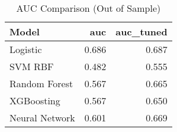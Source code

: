 \begin{table}
\caption{AUC Comparison (Out of Sample)}
\label{tab:auc_oos_compare}
\begin{tabular}{lrr}
\toprule
Model & auc & auc\_tuned \\
\midrule
Logistic & 0.686 & 0.687 \\
SVM RBF & 0.482 & 0.555 \\
Random Forest & 0.567 & 0.665 \\
XGBoosting & 0.567 & 0.650 \\
Neural Network & 0.601 & 0.669 \\
\bottomrule
\end{tabular}
\end{table}
